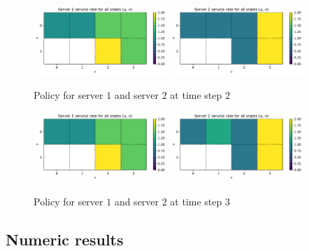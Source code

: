 \begin{figure}[H]
    \includegraphics[width=0.45\textwidth]{chapters/06_agent_based_extension/Bin/reinforcement_learning_policy_example/server_1_2.pdf}
    \includegraphics[width=0.45\textwidth]{chapters/06_agent_based_extension/Bin/reinforcement_learning_policy_example/server_2_2.pdf}
    \caption{Policy for server \(1\) and server \(2\) at time step \(2\)}
    \label{fig:reinforcement_learning_policy_exmaple_2}
\end{figure}

\begin{figure}[H]
    \includegraphics[width=0.45\textwidth]{chapters/06_agent_based_extension/Bin/reinforcement_learning_policy_example/server_1_3.pdf}
    \includegraphics[width=0.45\textwidth]{chapters/06_agent_based_extension/Bin/reinforcement_learning_policy_example/server_2_3.pdf}
    \caption{Policy for server \(1\) and server \(2\) at time step \(3\)}
    \label{fig:reinforcement_learning_policy_exmaple_3}
\end{figure}



\subsection{Numeric results}\label{sec:reiforcement_learning_numeric_results}

